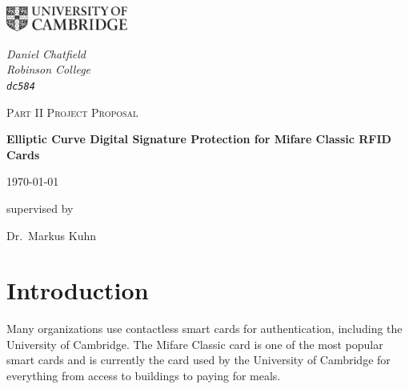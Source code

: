 \documentclass[a4paper, 12pt]{article}
\begin{document}
  \begin{titlepage}

    \begin{minipage}[t][][t]{0.5\textwidth}
      \includegraphics[width=40mm]{./figures/uclogo.pdf}
    \end{minipage}
    \begin{minipage}{0.5\textwidth}
      \begin{flushright}
        \large
        \textit{Daniel Chatfield}
        \\
        \textit{Robinson College}
        \\
        \texttt{\textit{dc584}}
      \end{flushright}
    \end{minipage}

    \vfill

    \begin{center}

      {\scshape\Large Part II Project Proposal}
      \vspace{1.5cm}

      {\huge\bfseries Elliptic Curve Digital Signature Protection for Mifare
      Classic RFID Cards\par}
      \vspace{1cm}

      {\large \today}

      \vfill
  	  supervised by\par
  	  Dr.~Markus Kuhn

    \end{center}



  \end{titlepage}


  \section*{Introduction}

  Many organizations use contactless smart cards for authentication, including
  the University of Cambridge. The Mifare Classic card is one of the most
  popular smart cards and is currently the card used by the University of
  Cambridge for everything from access to buildings to paying for meals.
\end{document}
